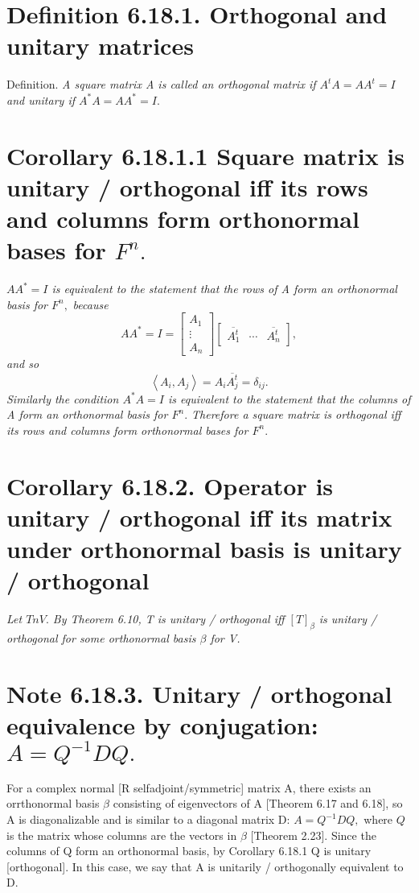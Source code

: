 \documentclass[12pt,english]{article}
\begin{document}
\section{Definition 6.18.1. Orthogonal and unitary matrices}

Definition. \emph{A square matrix A is called an orthogonal matrix
if $A^{t}A=AA^{t}=I$ and unitary if $A^{*}A=AA^{*}=I.$ }

\section{Corollary 6.18.1.1 Square matrix is unitary / orthogonal iff its
rows and columns form orthonormal bases for $F^{n}.$}

\emph{$AA^{*}=I$ is equivalent to the statement that the rows of
A form an orthonormal basis for $F^{n},$} \emph{because
\[
AA^{*}=I=\begin{bmatrix}A_{1}\\
\vdots\\
A_{n}
\end{bmatrix}\begin{bmatrix}\overline{A_{1}^{t}} & \cdots & \overline{A_{n}^{t}}\end{bmatrix},
\]
and so
\[
\left\langle A_{i},A_{j}\right\rangle =A_{i}\overline{A_{j}^{t}}=\delta_{ij}.
\]
Similarly the condition $A^{*}A=I$ is equivalent to the statement
that the columns of A form an orthonormal basis for $F^{n}.$ Therefore
a square matrix is orthogonal iff its rows and columns form orthonormal
bases for $F^{n}.$}

\section{Corollary 6.18.2. Operator is unitary / orthogonal iff its matrix
under orthonormal basis is unitary / orthogonal}

\emph{Let $TnV.$ By Theorem 6.10, T is unitary / orthogonal iff $\left[T\right]_{\beta}$
is unitary / orthogonal for some orthonormal basis $\beta$ for V.}

\section{Note 6.18.3. Unitary / orthogonal equivalence by conjugation: $A=Q^{-1}DQ.$ }

For a complex normal {[}R selfadjoint/symmetric{]} matrix A, there
exists an orrthonormal basis $\beta$ consisting of eigenvectors of
A {[}Theorem 6.17 and 6.18{]}, so A is diagonalizable and is similar
to a diagonal matrix D: $A=Q^{-1}DQ,$ where $Q$ is the matrix whose
columns are the vectors in $\beta$ {[}Theorem 2.23{]}. Since the
columns of Q form an orthonormal basis, by Corollary 6.18.1 Q is unitary
{[}orthogonal{]}. In this case, we say that A is unitarily / orthogonally
equivalent to D.
\end{document}
